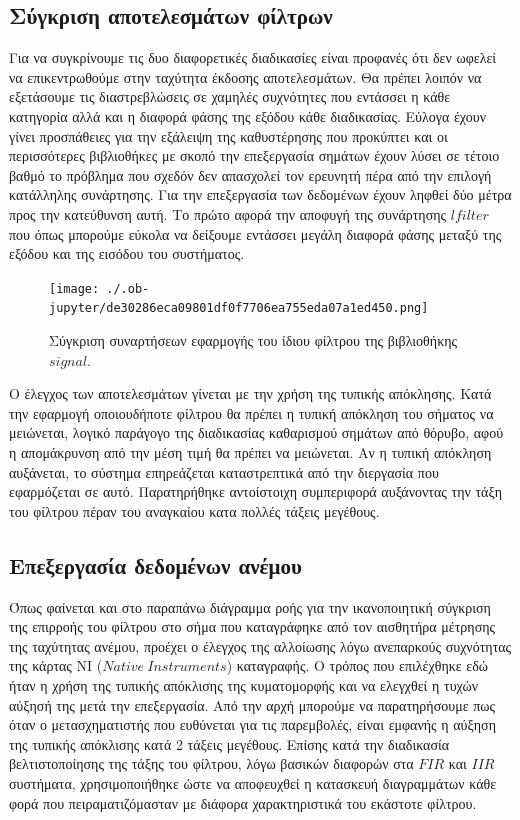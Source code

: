 \documentclass[breaklines=true, 12pt]{article}
\begin{document}
\subsection{Σύγκριση αποτελεσμάτων φίλτρων}
\label{sec:org5792cc9}
Για να συγκρίνουμε τις δυο διαφορετικές διαδικασίες είναι προφανές ότι δεν
ωφελεί να επικεντρωθούμε στην ταχύτητα έκδοσης αποτελεσμάτων. Θα πρέπει λοιπόν
να εξετάσουμε τις διαστρεβλώσεις σε χαμηλές συχνότητες που εντάσσει η κάθε
κατηγορία αλλά και η διαφορά φάσης της εξόδου κάθε διαδικασίας. Εύλογα έχουν
γίνει προσπάθειες για την εξάλειψη της καθυστέρησης που προκύπτει και οι
περισσότερες βιβλιοθήκες με σκοπό την επεξεργασία σημάτων έχουν λύσει σε
τέτοιο βαθμό το πρόβλημα που σχεδόν δεν απασχολεί τον ερευνητή πέρα από την
επιλογή κατάλληλης συνάρτησης. Για την επεξεργασία των δεδομένων έχουν ληφθεί
δύο μέτρα προς την κατεύθυνση αυτή. Το πρώτο αφορά την αποφυγή της συνάρτησης
\(lfilter\) που όπως μπορούμε εύκολα να δείξουμε εντάσσει μεγάλη διαφορά φάσης μεταξύ
της εξόδου και της εισόδου του συστήματος.

\begin{figure}[htbp]
\centering
\texttt{[image: ./.ob-jupyter/de30286eca09801df0f7706ea755eda07a1ed450.png]}
\caption{Σύγκριση συναρτήσεων εφαρμογής του ίδιου φίλτρου της βιβλιοθήκης \(signal\).}
\end{figure}

Ο έλεγχος των αποτελεσμάτων γίνεται με την χρήση της τυπικής απόκλησης. Κατά
την εφαρμογή οποιουδήποτε φίλτρου θα πρέπει η τυπική απόκληση του σήματος να
μειώνεται, λογικό παράγογο της διαδικασίας καθαρισμού σημάτων από θόρυβο, αφού
η απομάκρυνση από την μέση τιμή θα πρέπει να μειώνεται. Αν η τυπική απόκληση
αυξάνεται, το σύστημα επηρεάζεται καταστρεπτικά από την διεργασία που
εφαρμόζεται σε αυτό. Παρατηρήθηκε αντοίστοιχη συμπεριφορά αυξάνοντας την τάξη
του φίλτρου πέραν του αναγκαίου κατα πολλές τάξεις μεγέθους.
\subsection{Επεξεργασία δεδομένων ανέμου}
\label{sec:orgd04c393}
Όπως φαίνεται και στο παραπάνω διάγραμμα ροής για την ικανοποιητική σύγκριση
της επιρροής του φίλτρου στο σήμα που καταγράφηκε από τον αισθητήρα μέτρησης
της ταχύτητας ανέμου, προέχει ο έλεγχος της αλλοίωσης λόγω ανεπαρκούς
συχνότητας της κάρτας ΝΙ (\(Native\ Instruments\)) καταγραφής. Ο τρόπος που επιλέχθηκε
εδώ ήταν η χρήση της τυπικής απόκλισης της κυματομορφής και να ελεγχθεί η
τυχών αύξησή της μετά την επεξεργασία. Από την αρχή μπορούμε να
παρατηρήσουμε πως όταν ο μετασχηματιστής που ευθύνεται για τις παρεμβολές,
είναι εμφανής η αύξηση της τυπικής απόκλισης κατά 2 τάξεις μεγέθους. Επίσης
κατά την διαδικασία βελτιστοποίησης της τάξης του φίλτρου, λόγω βασικών
διαφορών στα \(FIR\) και \(IIR\) συστήματα, χρησιμοποιήθηκε ώστε να αποφευχθεί η
κατασκευή διαγραμμάτων κάθε φορά που πειραματιζόμασταν με διάφορα
χαρακτηριστικά του εκάστοτε φίλτρου.
\end{document}
